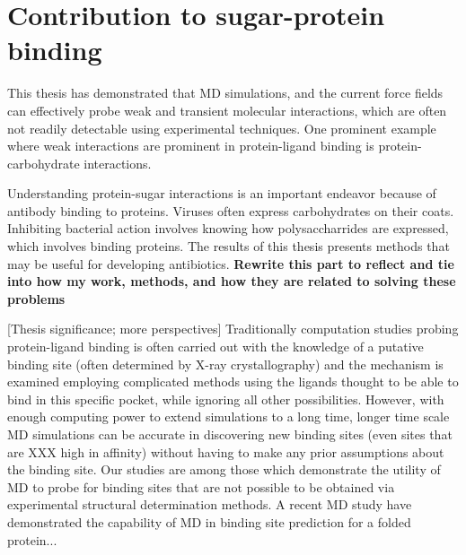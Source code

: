 \section{Contribution to sugar-protein binding}
This thesis has demonstrated that MD simulations, and the current force fields can effectively probe weak and transient molecular interactions, which are often not readily detectable using experimental techniques. One prominent example where weak interactions are prominent in protein-ligand binding is protein-carbohydrate interactions.\cite{weak binding review paper}

Understanding protein-sugar interactions is an important endeavor because of antibody binding to proteins.  Viruses often express carbohydrates on their coats.  Inhibiting bacterial action involves knowing how polysaccharrides are expressed, which involves binding proteins.  The results of this thesis presents methods that may be useful for developing antibiotics. \textbf{Rewrite this part to reflect and tie into how my work, methods, and how they are related to solving these problems} 


[Thesis significance; more perspectives] Traditionally computation studies probing protein-ligand binding is often carried out with the knowledge of a putative binding site (often determined by X-ray crystallography) and the mechanism is examined employing complicated methods using the ligands thought to be able to bind in this specific pocket, while ignoring all other possibilities.  However, with enough computing power to extend simulations to a long time, longer time scale MD simulations can be accurate in discovering new binding sites (even sites that are XXX high in affinity) without having to make any prior assumptions about the binding site. Our studies are among those which demonstrate the utility of MD to probe for binding sites that are not possible to be obtained via experimental structural determination methods.  A recent MD study have demonstrated the capability of MD in binding site prediction for a folded protein...\cite{Shan:2011bo}


